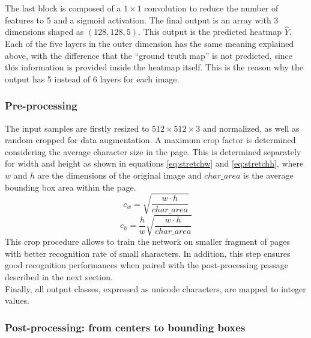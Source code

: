 The last block is composed of a $1 \times 1$ convolution to reduce the number of features to 5 and a sigmoid activation. The final output is an array with 3 dimensions shaped as $(128, 128, 5)$. This output is the predicted heatmap $\widehat{Y}$. Each of the five layers in the outer dimension has the same meaning explained above, with the difference that the “ground truth map” is not predicted, since this information is provided inside the heatmap itself. This is the reason why the output has 5 instead of 6 layers for each image.

\subsubsection{Pre-processing}
\label{sssec:preprocessingdet}

The input samples are firstly resized to $512 \times 512 \times 3$ and normalized, as well as random cropped for data augmentation. A maximum crop factor is determined considering the average character size in the page. This is determined separately for width and height as shown in equations \ref{eq:stretchw} and \ref{eq:stretchh}, where $w$ and $h$ are the dimensions of the original image and $char\_area$ is the average bounding box area within the page.
\begin{equation}\label{eq:stretchw}
	c_w=\sqrt{\frac{w \cdot h}{char\_area}}
\end{equation}
\begin{equation}
\label{eq:stretchh}
	c_h=\frac{h}{w}\sqrt{\frac{w \cdot h}{char\_area}}
\end{equation}
This crop procedure allows to train the network on smaller fragment of pages with better recognition rate of small sharacters. In addition, this step ensures good recognition performances when paired with the post-processing passage described in the next section.\\
\noindent Finally, all output classes, expressed as unicode characters, are mapped to integer values.

\subsubsection{Post-processing: from centers to bounding boxes}
\label{sssec:preprocessingandtraining}

